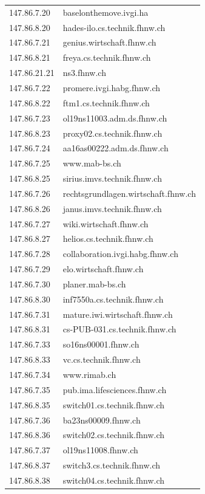 \documentclass[11pt,a4paper]{scrartcl}
\begin{document}
\begin{longtable}{p{2.5cm}|p{7cm}}
	147.86.7.20 & baselonthemove.ivgi.ha \\
	147.86.8.20 & hades-ilo.cs.technik.fhnw.ch \\
	147.86.7.21 & genius.wirtschaft.fhnw.ch \\
	147.86.8.21 & freya.cs.technik.fhnw.ch \\
	147.86.21.21 & ns3.fhnw.ch \\
	147.86.7.22 & promere.ivgi.habg.fhnw.ch \\
	147.86.8.22 & ftm1.cs.technik.fhnw.ch \\
	147.86.7.23 & ol19ns11003.adm.ds.fhnw.ch \\
	147.86.8.23 & proxy02.cs.technik.fhnw.ch \\
	147.86.7.24 & aa16as00222.adm.ds.fhnw.ch \\
	147.86.7.25 & www.mab-bs.ch \\
	147.86.8.25 & sirius.imvs.technik.fhnw.ch \\
	147.86.7.26 & rechtsgrundlagen.wirtschaft.fhnw.ch \\
	147.86.8.26 & janus.imvs.technik.fhnw.ch \\
	147.86.7.27 & wiki.wirtschaft.fhnw.ch \\
	147.86.8.27 & helios.cs.technik.fhnw.ch \\
	147.86.7.28 & collaboration.ivgi.habg.fhnw.ch \\
	147.86.7.29 & elo.wirtschaft.fhnw.ch \\
	147.86.7.30 & planer.mab-bs.ch \\
	147.86.8.30 & inf7550a.cs.technik.fhnw.ch \\
	147.86.7.31 & mature.iwi.wirtschaft.fhnw.ch \\
	147.86.8.31 & cs-PUB-031.cs.technik.fhnw.ch \\
	147.86.7.33 & so16ns00001.fhnw.ch \\
	147.86.8.33 & vc.cs.technik.fhnw.ch \\
	147.86.7.34 & www.rimab.ch \\
	147.86.7.35 & pub.ima.lifesciences.fhnw.ch \\
	147.86.8.35 & switch01.cs.technik.fhnw.ch \\
	147.86.7.36 & ba23ns00009.fhnw.ch \\
	147.86.8.36 & switch02.cs.technik.fhnw.ch \\
	147.86.7.37 & ol19ns11008.fhnw.ch \\
	147.86.8.37 & switch3.cs.technik.fhnw.ch \\
	147.86.8.38 & switch04.cs.technik.fhnw.ch \\

\end{longtable}
\end{document}
